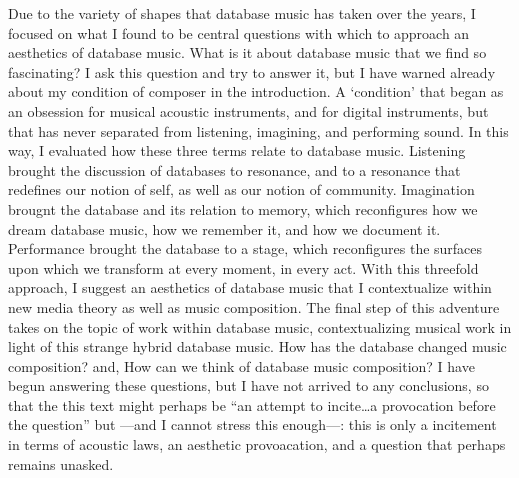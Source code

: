 Due to the variety of shapes that database music has taken over the years, I focused on what I found to be central questions with which to approach an aesthetics of database music. What is it about database music that we find so fascinating? I ask this question and try to answer it, but I have warned already about my condition of composer in the introduction. A `condition' that began as an obsession for musical acoustic instruments, and for digital instruments, but that has never separated from listening, imagining, and performing sound. In this way, I evaluated how these three terms relate to database music. Listening brought the discussion of databases to resonance, and to a resonance that redefines our notion of self, as well as our notion of community. Imagination brougnt the database and its relation to memory, which reconfigures how we dream database music, how we remember it, and how we document it. Performance brought the database to a stage, which reconfigures the surfaces upon which we transform at every moment, in every act. With this threefold approach, I suggest an aesthetics of database music that I contextualize within new media theory as well as music composition. The final step of this adventure takes on the topic of work within database music, contextualizing musical work in light of this strange hybrid database music. How has the database changed music composition? and, How can we think of database music composition? I have begun answering these questions, but I have not arrived to any conclusions, so that the this text might perhaps be ``an attempt to incite\dots a provocation before the question'' but ---and I cannot stress this enough---: this is only a incitement in terms of acoustic laws, an aesthetic provoacation, and a question that perhaps remains unasked.
